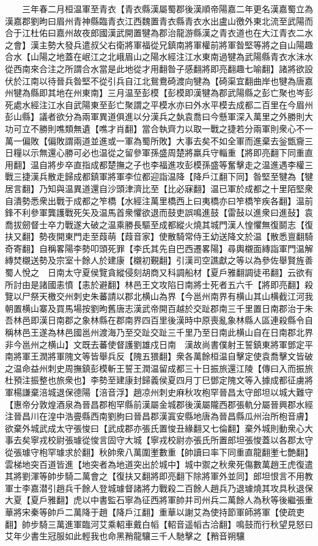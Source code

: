 　　三年春二月桓温軍至青衣【青衣縣漢屬蜀郡後漢順帝陽嘉二年更名漢嘉蜀立為漢嘉郡劉昫曰眉州青神縣臨青衣江西魏置青衣縣青衣水出盧山徼外東北流至武陽而合于江杜佑曰嘉州故夜郎國漢武開置犍為郡治龍游縣漢之青衣道也在大江青衣二水之會】漢主勢大發兵遣叔父右衛將軍福從兄鎮南將軍權前將軍昝堅等將之自山陽趣合水【山陽之地蓋在岷江之北峨眉山之陽水經注江水東南過犍為武陽縣青衣水沬水從西南來合注之所謂合水當是此地從才用翻昝子感翻將即亮翻趣七喻翻】諸將欲設伏於江南以待晉兵昝堅不從引兵自江北鴛鴦碕渡向犍為【碕渠宜翻曲岸也犍為唐嘉州犍為縣即其地在州東南】三月温至彭模【彭模即漢犍為郡武陽縣之彭亡聚也岑彭死處水經注江水自武陽東至彭亡聚謂之平模水亦曰外水平模去成都二百里在今眉州彭山縣】議者欲分為兩軍異道俱進以分漢兵之埶袁喬曰今懸軍深入萬里之外勝則大功可立不勝則噍類無遺【噍才肖翻】當合執齊力以取一戰之捷若分兩軍則衆心不一萬一偏敗【偏敗謂兩道並進或一軍為蜀所敗】大事去矣不如全軍而進棄去釡甑齎三日糧以示無還心勝可必也温從之留參軍孫盛周楚將羸兵守輜重【將即亮翻下同重直用翻】温自將步卒直指成都楚撫之子也李福進攻彭模孫盛等奮擊走之温進遇李權三戰三捷漢兵散走歸成都鎮軍將軍李位都迎詣温降【降戶江翻下同】昝堅至犍為【犍居言翻】乃知與温異道還自沙頭津濟比至【比必寐翻】温已軍於成都之十里陌堅衆自潰勢悉衆出戰于成都之笮橋【水經注萬里橋西上曰夷橋亦曰笮橋笮疾各翻】温前鋒不利參軍龔護戰死矢及温馬首衆懼欲退而鼓吏誤鳴進鼓【雷鼔以進衆曰進鼔】袁喬拔劒督士卒力戰遂大破之温乘勝長驅至成都縱火燒其城門漢人惶懼無復鬬志【復扶又翻】勢夜開東門走至葭萌【葭音家】使散騎常侍王幼送降文於温【散悉亶翻騎奇寄翻】自稱畧陽李勢叩頭死罪【李氏其先自巴西遷畧陽】尋輿櫬面縳詣軍門温解縳焚櫬送勢及宗室十餘人於建康【櫬初覲翻】引漢司空譙獻之等以為參佐舉賢旌善蜀人悅之　日南太守夏侯覽貪縱侵刻胡商又科調船材【夏戶雅翻調徒弔翻】云欲有所討由是諸國恚憤【恚於避翻】林邑王文攻陷日南將士死者五六千【將即亮翻】殺覽以尸祭天檄交州刺史朱蕃請以郡北横山為界【今邕州南界有横山其山横截江河我朝置横山寨及買馬場按劉昫舊唐志漢武帝開百越於交趾郡南三千里置日南郡治于朱吾林邑即漢日南郡之象林縣在郡南界四百里後漢時中原喪亂象林縣人區連殺縣令自稱林邑王遂為林邑國邕州渡海乃至交趾交趾三千里乃至日南此横山自在日南郡北界非今邕州之横山】文既去蕃使督護劉雄戍日南　漢故尚書僕射王誓鎮東將軍鄧定平南將軍王潤將軍隗文等皆舉兵反【隗五猥翻】衆各萬餘桓温自擊定使袁喬擊文皆破之温命益州刺史周撫鎮彭模斬王誓王潤温留成都三十日振旅還江陵【傳曰入而振旅杜預注振整也旅衆也】李勢至建康封歸義侯夏四月丁巳鄧定隗文等入據成都征虜將軍楊謙棄涪城退保德陽【涪音浮】趙凉州刺史麻秋攻枹罕晉昌太守郎坦以城大難守【惠帝分敦煌酒泉為晉昌郡枹罕縣前漢屬金城郡後漢屬隴西郡張軌分屬晉興郡水經注晉昌川在湟中浩亹縣西南劉朐曰晉昌郡漢寘安縣地唐為晉昌縣瓜州治所枹音膚】欲棄外城武成太守張悛曰【武成郡亦張氏置悛丑緣翻又七倫翻】棄外城則動衆心大事去矣寧戎校尉張璩從悛言固守大城【寧戎校尉亦張氏所置郎坦張悛蓋以各郡太守從張璩守枹罕璩求於翻】秋帥衆八萬圍壍數重【帥讀曰率下同重直龍翻壍七艶翻】雲梯地突百道皆進【地突者為地道突出於城中】城中禦之秋衆死傷數萬趙王虎復遣其將劉渾等帥步騎二萬會之【復扶又翻將即亮翻下除將軍外並同】郎坦恨言不用教軍士李嘉潜引趙兵千餘人登城璩督諸將力戰殺二百餘人趙兵乃退璩燒其攻具秋退保大夏【夏戶雅翻】虎以中書監石寧為征西將軍帥并司州兵二萬餘人為秋等後繼張重華將宋秦等帥戶二萬降于趙【降戶江翻】重華以謝艾為使持節軍師將軍【使疏吏翻】帥步騎三萬進軍臨河艾乘軺車戴白幍【軺音遥幍古洽翻】鳴鼓而行秋望見怒曰艾年少書生冠服如此輕我也命黑矟龍驤三千人馳擊之【矟音朔驤